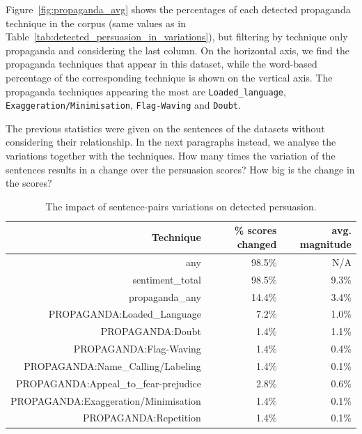 Figure~\ref{fig:propaganda_avg} shows the percentages of each detected propaganda technique in the corpus (same values as in Table~\ref{tab:detected_persuasion_in_variations}), but filtering by technique only propaganda and considering the last column.
On the horizontal axis, we find the propaganda techniques that appear in this dataset, while the word-based percentage of the corresponding technique is shown on the vertical axis.
The propaganda techniques appearing the most are \texttt{Loaded\_language}, \texttt{Exaggeration/Minimisation}, \texttt{Flag-Waving} and \texttt{Doubt}.

The previous statistics were given on the sentences of the datasets without considering their relationship.
In the next paragraphs instead, we analyse the variations together with the techniques.
How many times the variation of the sentences results in a change over the persuasion scores? How big is the change in the scores?

\begin{table}[!htbp]
    \centering
    \begin{tabular}{r|rr}
         Technique & \% scores changed & avg. magnitude \\
         \hline
         any & 98.5\% & N/A \\
        sentiment\_total & 98.5\% & 9.3\% \\
        propaganda\_any & 14.4\% & 3.4\% \\
        PROPAGANDA:Loaded\_Language & 7.2\% & 1.0\% \\
        PROPAGANDA:Doubt & 1.4\% & 1.1\% \\
        PROPAGANDA:Flag-Waving & 1.4\% & 0.4\% \\
        PROPAGANDA:Name\_Calling/Labeling & 1.4\% & 0.1\% \\
        PROPAGANDA:Appeal\_to\_fear-prejudice & 2.8\% & 0.6\% \\
        PROPAGANDA:Exaggeration/Minimisation & 1.4\% & 0.1\% \\
        PROPAGANDA:Repetition & 1.4\% & 0.1\% \\
    \end{tabular}
    \caption{The impact of sentence-pairs variations on detected persuasion.}
    \label{tab:change_scores_persuasion_in_variations}
\end{table}

